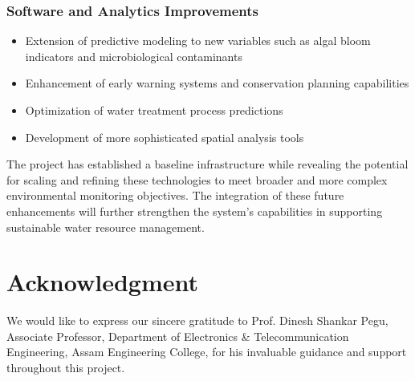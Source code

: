 \documentclass[conference]{IEEEtran}
\begin{document}
\subsubsection{Software and Analytics Improvements}
\begin{itemize}
\item Extension of predictive modeling to new variables such as algal bloom indicators and microbiological contaminants
\item Enhancement of early warning systems and conservation planning capabilities
\item Optimization of water treatment process predictions
\item Development of more sophisticated spatial analysis tools
\end{itemize}

The project has established a baseline infrastructure while revealing the potential for scaling and refining these technologies to meet broader and more complex environmental monitoring objectives. The integration of these future enhancements will further strengthen the system's capabilities in supporting sustainable water resource management.

\section*{Acknowledgment}
We would like to express our sincere gratitude to Prof. Dinesh Shankar Pegu, Associate Professor, Department of Electronics \& Telecommunication Engineering, Assam Engineering College, for his invaluable guidance and support throughout this project.
\end{document}
